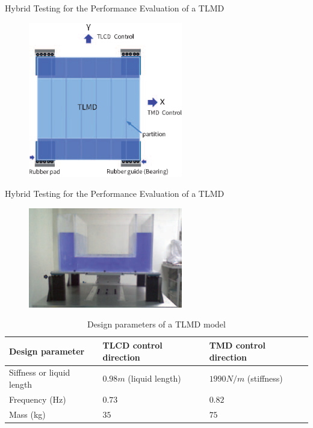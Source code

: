 \documentclass[usepdftitle=false]{beamer}
\newcommand\Fontvi{\fontsize{6}{7.2}\selectfont}
\begin{document}
\begin{frame}{Hybrid Testing for the Performance Evaluation of a TLMD}
\begin{figure}[ht]
\centering
\includegraphics[width=0.6\textwidth] {figure/5-1.eps}
\label{fig:5-1}
\end{figure}
\end{frame}

\begin{frame}{Hybrid Testing for the Performance Evaluation of a TLMD}
\begin{figure}[ht]
\centering
\includegraphics[width=0.6\textwidth] {figure/5-2.eps}
\label{fig:5-2}
\end{figure}
\Fontvi
\begin{table}[ht]
\centering
\begin{tabularx}{\textwidth}{@{}X|X|X@{}}
\toprule[1pt]\midrule[0.3pt]
Design parameter & TLCD control direction & TMD control direction\\ \hline
Siffness or liquid length & $0.98m$ (liquid length) & $1990N/m$ (stiffness)\\
Frequency (Hz) & $0.73$ & $0.82$\\
Mass (kg) & $35$ & $75$\\
\bottomrule
\end{tabularx}
\caption{Design parameters of a TLMD model}
\label{tab:5-3}
\end{table}
\end{frame}
\end{document}
